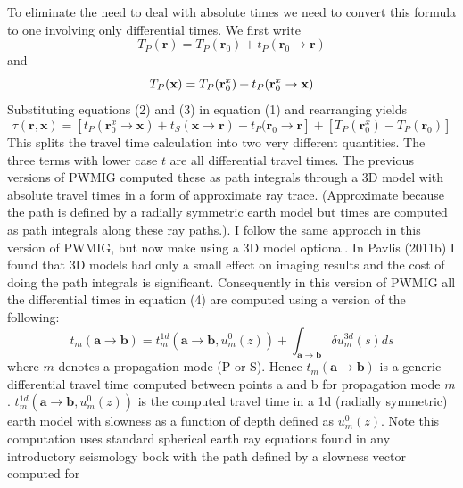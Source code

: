 \documentclass[12pt]{amsart}
\begin{document}
To eliminate the need to deal with absolute times we need to convert this formula to one involving only differential times.
We first write 
\begin{equation}
T_P (\mathbf{r}) = T_P (\mathbf{r}_0 ) + t_P (\mathbf{r}_0 \rightarrow \mathbf{r} )
\end{equation}
and
\begin{equation}
T_P(\mathbf{x}) = T_P (\mathbf{r}_0^x ) + t_P (\mathbf{r}_0^x \rightarrow \mathbf{x} ) \\
\end{equation}
Substituting equations (2) and (3) in equation (1) and rearranging yields
\begin{equation}
\tau ( \mathbf{r},\mathbf{x}) = 
[ t_P (\mathbf{r}_0^x \rightarrow \mathbf{x} ) 
+  t_S(\mathbf{x} \rightarrow \mathbf{r})
- t_P (\mathbf{r}_0 \rightarrow \mathbf{r}  ]
+
[ T_P (\mathbf{r}_0 ^x)  - T_P (\mathbf{r}_0 ) ]
\end{equation}
This splits the travel time calculation into two very different quantities.   The three terms with lower case $t$ are all differential travel times.   The previous versions of PWMIG computed these as path integrals through a 3D model 
with absolute travel times in a form of approximate ray trace.  (Approximate because the path is defined by a radially
symmetric earth model but times are computed as path integrals along these ray paths.).  I follow the same approach 
in this version of PWMIG, but now make using a 3D model optional.   In Pavlis (2011b) I found that 3D models had only
a small effect on imaging results and the cost of doing the path integrals is significant.   Consequently in this version of
PWMIG all the differential times in equation (4) are computed using a version of the following:
\begin{equation}
t_m ( \mathbf{a} \rightarrow \mathbf{b} ) = t_m^{1d} ( \mathbf{a} \rightarrow \mathbf{b}, u_m^0(z) )
+ \int_{\mathbf{a} \rightarrow \mathbf{b}} \delta u_m^{3d} (s) ds
\end{equation}
where $m$ denotes a propagation mode (P or S).   Hence $t_m ( \mathbf{a} \rightarrow \mathbf{b} )$ is a generic
differential travel time computed between points a and b for propagation mode $m$.
$t_m^{1d} ( \mathbf{a} \rightarrow \mathbf{b}, u_m^0(z) )$ is the computed travel time in a 1d (radially symmetric) earth 
model with slowness as a function of depth defined as $u_m^0(z) $.   Note this computation uses standard spherical earth ray equations found in any introductory seismology book with the path defined by a slowness vector computed for 
\end{document}
